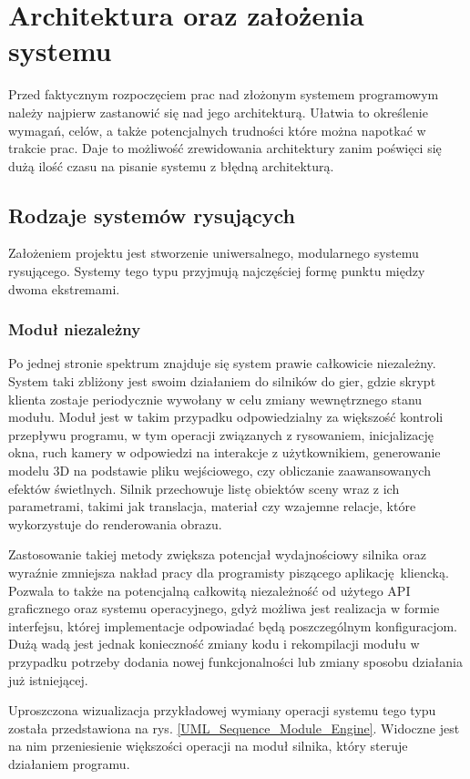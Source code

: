 \chapter{Architektura oraz założenia systemu}
Przed faktycznym rozpoczęciem prac nad złożonym systemem programowym należy najpierw zastanowić się nad jego architekturą.
Ułatwia to określenie wymagań, celów, a także potencjalnych trudności które można napotkać w trakcie prac. 
Daje to możliwość zrewidowania architektury zanim poświęci się dużą ilość czasu na pisanie systemu z błędną architekturą.

\section{Rodzaje systemów rysujących}
Założeniem projektu jest stworzenie uniwersalnego, modularnego systemu rysującego.
Systemy tego typu przyjmują najczęściej formę punktu między dwoma ekstremami. 

\subsection{Moduł niezależny}
\label{Subsection_module_types_engine}
Po jednej stronie spektrum znajduje się system prawie całkowicie niezależny. System taki zbliżony jest swoim działaniem do  silników do gier, gdzie skrypt klienta zostaje periodycznie wywołany w celu zmiany wewnętrznego stanu modułu. Moduł jest w takim przypadku odpowiedzialny za większość kontroli przepływu programu, w tym operacji związanych z rysowaniem, inicjalizację okna, ruch kamery w odpowiedzi na interakcje z użytkownikiem, generowanie modelu 3D na podstawie pliku wejściowego, czy obliczanie zaawansowanych efektów świetlnych. Silnik przechowuje listę obiektów sceny wraz z ich parametrami, takimi jak translacja, materiał czy wzajemne relacje, które wykorzystuje do renderowania obrazu. 

Zastosowanie takiej metody zwiększa potencjał wydajnościowy silnika oraz wyraźnie zmniejsza nakład pracy dla programisty piszącego aplikację kliencką. Pozwala to także na potencjalną całkowitą niezależność od użytego API graficznego oraz systemu operacyjnego, gdyż możliwa jest realizacja w formie interfejsu, której implementacje odpowiadać będą poszczególnym konfiguracjom. Dużą wadą jest jednak konieczność zmiany kodu i rekompilacji modułu w przypadku potrzeby dodania nowej funkcjonalności lub zmiany sposobu działania już istniejącej. 

Uproszczona wizualizacja przykładowej wymiany operacji systemu tego typu została przedstawiona na rys. \ref{UML_Sequence_Module_Engine}. Widoczne jest na nim przeniesienie większości operacji na moduł silnika, który steruje działaniem programu.

